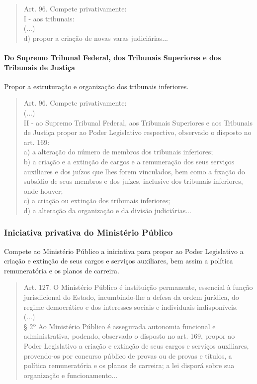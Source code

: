 \documentclass{article}
\begin{document}
\begin{quote}
    Art. 96. Compete privativamente:\\
    I - aos tribunais:\\
    (...)\\
    d) propor a criação de novas varas judiciárias... \cite{brasil_constituicao_1988}
\end{quote}

\paragraph{Do Supremo Tribunal Federal, dos Tribunais Superiores e dos Tribunais de Justiça} Propor a estruturação e organização dos tribunais inferiores.

\begin{quote}
    Art. 96. Compete privativamente:\\
    (...)\\
    II - ao Supremo Tribunal Federal, aos Tribunais Superiores e aos Tribunais de Justiça propor ao Poder Legislativo respectivo, observado o disposto no art. 169:\\
    a) a alteração do número de membros dos tribunais inferiores;\\
    b) a criação e a extinção de cargos e a remuneração dos seus serviços auxiliares e dos juízos que lhes forem vinculados, bem como a fixação do subsídio de seus membros e dos juízes, inclusive dos tribunais inferiores, onde houver;\\
    c) a criação ou extinção dos tribunais inferiores;\\
    d) a alteração da organização e da divisão judiciárias...  \cite{brasil_constituicao_1988}
\end{quote}

\subsubsection{Iniciativa privativa do Ministério Público}

Compete ao Ministério Público a iniciativa para propor ao Poder Legislativo a criação e extinção de seus cargos e serviços auxiliares, bem assim a política remuneratória e os planos de carreira.

\begin{quote}
    Art. 127. O Ministério Público é instituição permanente, essencial à função jurisdicional do Estado, incumbindo-lhe a defesa da ordem jurídica, do regime democrático e dos interesses sociais e individuais indisponíveis.\\
    (...)\\
    § 2º Ao Ministério Público é assegurada autonomia funcional e administrativa, podendo, observado o disposto no art. 169, propor ao Poder Legislativo a criação e extinção de seus cargos e serviços auxiliares, provendo-os por concurso público de provas ou de provas e títulos, a política remuneratória e os planos de carreira; a lei disporá sobre sua organização e funcionamento... \cite{brasil_constituicao_1988}
\end{quote}
\end{document}
